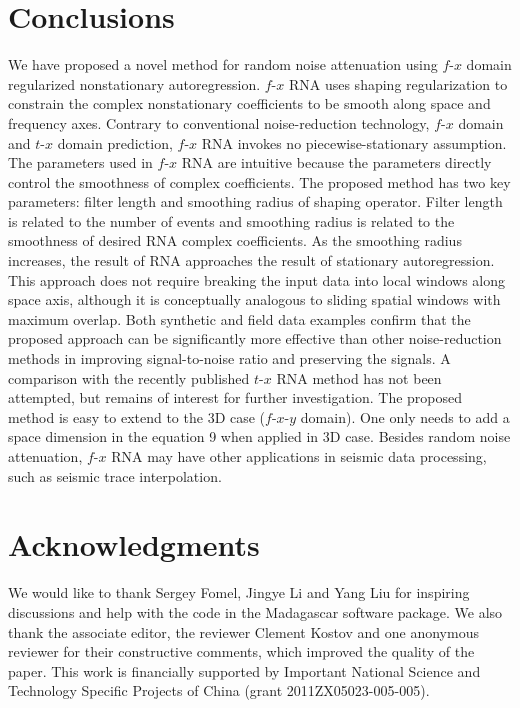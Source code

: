 \section{Conclusions}

We have proposed a novel method for random noise attenuation using $f$-$x$ 
domain regularized nonstationary autoregression. $f$-$x$ RNA uses shaping 
regularization to constrain the complex nonstationary coefficients to 
be smooth along space and frequency axes. Contrary to conventional 
noise-reduction technology, $f$-$x$ domain and $t$-$x$ domain prediction, $f$-$x$ 
RNA invokes no piecewise-stationary assumption. The parameters used in 
$f$-$x$ RNA are intuitive because the parameters directly control the 
smoothness of complex coefficients. The proposed method has two key 
parameters: filter length and smoothing radius of shaping operator. 
Filter length is related to the number of events and smoothing radius 
is related to the smoothness of desired RNA complex coefficients. As 
the smoothing radius increases, the result of RNA approaches the result 
of stationary autoregression. This approach does not require breaking 
the input data into local windows along space axis, although it is 
conceptually analogous to sliding spatial windows with maximum overlap. 
Both synthetic and field data examples confirm that the proposed approach 
can be significantly more effective than other noise-reduction methods 
in improving signal-to-noise ratio and preserving the signals. A 
comparison with the recently published $t$-$x$ RNA method has not been 
attempted, but remains of interest for further investigation. The 
proposed method is easy to extend to the 3D case ($f$-$x$-$y$ domain). 
One only needs to add a space dimension in the equation 9 when 
applied in 3D case. Besides random noise attenuation, $f$-$x$ RNA may 
have other applications in seismic data processing, such as seismic 
trace interpolation.

\section{Acknowledgments}

We would like to thank Sergey Fomel, Jingye Li and Yang Liu for inspiring 
discussions and help with the code in the Madagascar software package. 
We also thank the associate editor, the reviewer Clement Kostov and one 
anonymous reviewer for their constructive comments, which improved the
 quality of the paper. This work is financially supported by Important 
National Science and Technology Specific Projects of China 
(grant 2011ZX05023-005-005).








